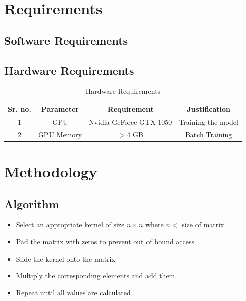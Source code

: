 \documentclass[12pt, letterpaper]{article}
\begin{document}
\section{Requirements}
\subsection{Software Requirements}


\subsection{Hardware Requirements}

\begin{table}[!htb]
\begin{center}
		\begin{tabular}{| c | c | c | c |}
		\hline
		\textbf{Sr. no.} & \textbf{Parameter} & \textbf{Requirement} & \textbf{Justification}\\
		\hline
		1 & GPU &  Nvidia GeForce GTX 1050 & Training the model \\
		\hline
		2 & GPU Memory & $>$4 GB & Batch Training\\
		\hline
		\end{tabular}
		\caption{Hardware Requirements}
\end{center}
\end{table}

\newpage
\section{Methodology}
\subsection{Algorithm}
\begin{itemize}
\item Select an appropriate kernel of size $n\times n$ where $n <$ size of matrix
\item Pad the matrix with zeros to prevent out of bound access
\item Slide the kernel onto the matrix
\item Multiply the corresponding elements and add them
\item Repeat until all values are calculated
\end{itemize}
\end{document}
